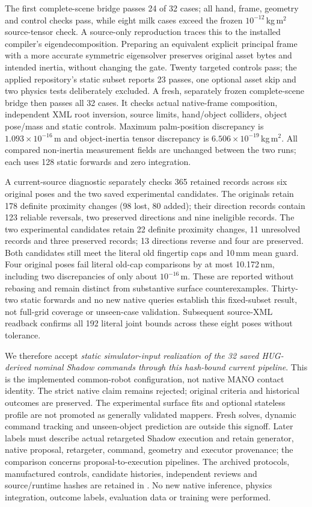 \documentclass[10pt,letterpaper]{article}
\begin{document}
The first complete-scene bridge passes 24 of 32 cases; all hand, frame,
geometry and control checks pass, while eight milk cases exceed the frozen
$10^{-12}$\,kg\,m$^2$ source-tensor check. A source-only reproduction traces
this to the installed compiler's eigendecomposition. Preparing an equivalent
explicit principal frame with a more accurate symmetric eigensolver preserves
original asset bytes and intended inertia, without changing the gate.
Twenty targeted controls pass; the applied repository's static subset reports
23 passes, one optional asset skip and two physics tests deliberately excluded.
A fresh, separately frozen complete-scene bridge then passes all 32 cases.
It checks actual native-frame composition, independent XML root inversion,
source limits, hand/object colliders, object pose/mass and static controls.
Maximum palm-position discrepancy is $1.093\times10^{-16}$\,m and object-inertia
tensor discrepancy is $6.506\times10^{-19}$\,kg\,m$^2$.
All compared non-inertia measurement fields are unchanged between the two runs; each uses
128 static forwards and zero integration.

A current-source diagnostic separately checks 365 retained records across
six original poses and the two saved experimental candidates. The originals
retain 178 definite proximity changes (98 lost, 80 added); their direction
records contain 123 reliable reversals, two preserved directions and nine
ineligible records. The two experimental candidates retain 22 definite
proximity changes, 11 unresolved records and three preserved records; 13
directions reverse and four are preserved. Both candidates still meet the
literal old fingertip caps and 10\,mm mean guard. Four original poses fail
literal old-cap comparisons by at most 10.172\,nm, including two discrepancies
of only about $10^{-16}$\,m. These are reported without rebasing and remain
distinct from substantive surface counterexamples. Thirty-two static forwards
and no new native queries establish this fixed-subset result, not full-grid
coverage or unseen-case validation. Subsequent source-XML readback confirms
all 192 literal joint bounds across these eight poses without tolerance.

We therefore accept \emph{static simulator-input realization of the 32 saved
HUG-derived nominal Shadow commands through this hash-bound current pipeline}.
This is the implemented common-robot configuration, not native MANO contact
identity. The strict native claim remains rejected; original criteria and
historical outcomes are preserved. The experimental surface fits and optional
stateless profile are not promoted as generally validated mappers. Fresh solves,
dynamic command tracking and unseen-object prediction are outside this
signoff. Later labels must describe actual retargeted Shadow execution and
retain generator, native proposal, retargeter, command, geometry and executor
provenance; the comparison concerns proposal-to-execution pipelines.
The archived protocols, manufactured controls, candidate histories, independent
reviews and source/runtime hashes are retained in
.
No new native inference, physics integration, outcome labels, evaluation data
or training were performed.
\end{document}
